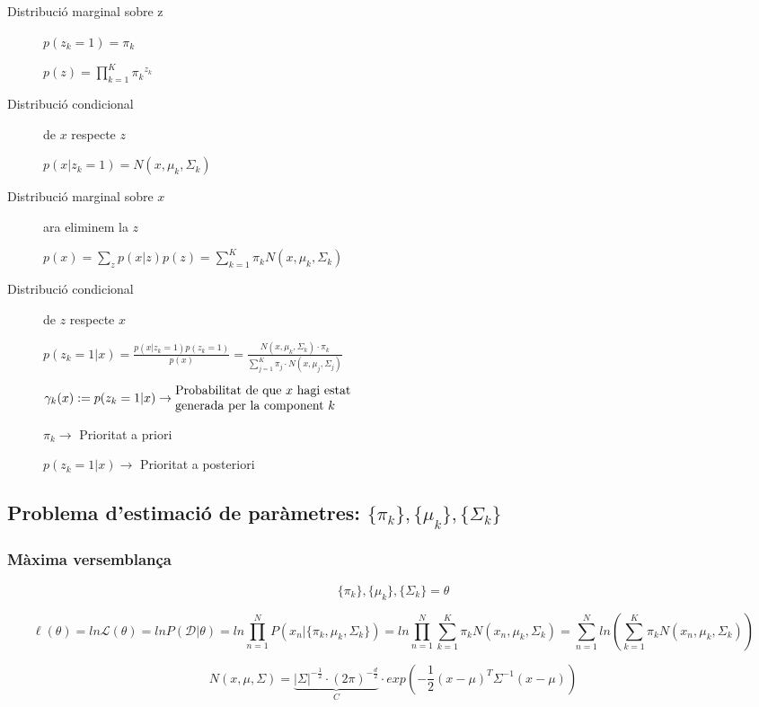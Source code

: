 \documentclass[a4paper]{article}
\begin{document}
\begin{description}
	\item[Distribució marginal sobre z] $p(z_k = 1) = \pi_k$
	
	$p(z) = \prod_{k=1}^K {\pi_k}^{z_k}$
	
	\item[Distribució condicional] de $x$ respecte $z$
	
	$p(x|z_k = 1) = N(x, \mu_k, \Sigma_k)$
	
	\item[Distribució marginal sobre $x$] ara eliminem la $z$
	
	$p(x) = \sum_z p(x|z)p(z) = \sum_{k=1}^K \pi_k N(x, \mu_k, \Sigma_k)$
	
	\item[Distribució condicional] de $z$ respecte $x$
	
	$p(z_k = 1|x) = \frac{p(x|z_k = 1)p(z_k = 1)}{p(x)} = 
	\frac{N(x, \mu_k, \Sigma_k)·\pi_k}{\sum_{j=1}^K \pi_j · N(x, \mu_j, \Sigma_j)}$
	
	$\gamma_k(x) := p(z_k = 1 | x) \rightarrow \parbox{14em}{Probabilitat de que $x$ hagi estat generada per la component $k$ }$
	
	$\pi_k \rightarrow$ Prioritat a priori
	
	$p(z_k = 1 | x) \rightarrow$ Prioritat a posteriori
\end{description}

\subsection{Problema d'estimació de paràmetres: $\{\pi_k\}, \{ \mu_k \}, \{ \Sigma_k \}$ }

\subsubsection{Màxima versemblança}

$$ \{\pi_k\}, \{ \mu_k \}, \{ \Sigma_k \} = \theta $$

$$ 
\ell(\theta) = ln \mathcal{L}(\theta) = ln P(\mathcal{D}|\theta) =
ln \prod_{n=1}^N P(x_n | \{\pi_k, \mu_k, \Sigma_k \}) =
ln \prod_{n=1}^N \sum_{k=1}^K \pi_k N(x_n, \mu_k, \Sigma_k) = 
\sum_{n=1}^N ln\left(\sum_{k=1}^K \pi_k N\left(x_n, \mu_k, \Sigma_k \right) \right)
$$

$$
N(x, \mu, \Sigma) = \underbrace{|\Sigma|^{-\frac{1}{2}}·(2\pi)^{-\frac{d}{2}}}_C·exp\left( -\frac{1}{2}(x - \mu)^T \Sigma^{-1}(x-\mu) \right)
$$
\end{document}
